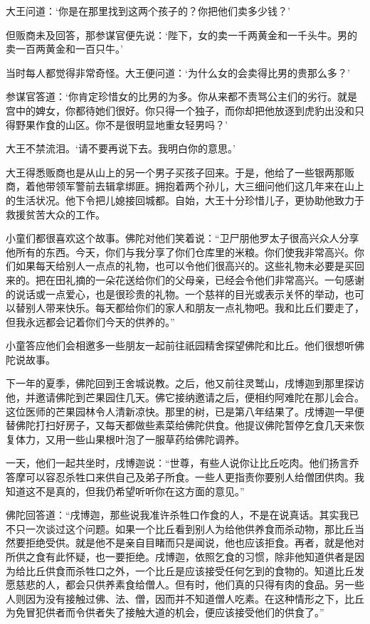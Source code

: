 \documentclass[12pt,twoside,openany]{book}
\begin{document}
大王问道：‘你是在那里找到这两个孩子的？你把他们卖多少钱？’

但贩商未及回答，那参谋官便先说：‘陛下，女的卖一千两黄金和一千头牛。男的卖一百两黄金和一百只牛。’

当时每人都觉得非常奇怪。大王便问道：‘为什么女的会卖得比男的贵那么多？’

参谋官答道：‘你肯定珍惜女的比男的为多。你从来都不责骂公主们的劣行。就是宫中的婢女，你都待她们很好。你只得一个独子，而你却把他放逐到虎豹出没和只得野果作食的山区。你不是很明显地重女轻男吗？’

大王不禁流泪。‘请不要再说下去。我明白你的意思。’

大王得悉贩商也是从山上的另一个男子买孩子回来。于是，他给了一些银两那贩商，着他带领军警前去辑拿绑匪。拥抱着两个孙儿，大三细问他们这几年来在山上的生活状况。他下令把儿媳接回城都。自始，大王十分珍惜儿子，更协助他致力于救援贫苦大众的工作。

小童们都很喜欢这个故事。佛陀对他们笑着说：“卫尸朋他罗太子很高兴众人分享他所有的东西。今天，你们与我分享了你们仓库里的米粮。你们使我非常高兴。你们如果每天给别人一点点的礼物，也可以令他们很高兴的。这些礼物未必要是买回来的。把在田礼摘的一朵花送给你们的父母亲，已经会令他们非常高兴。一句感谢的说话或一点爱心，也是很珍贵的礼物。一个慈祥的目光或表示关怀的举动，也可以替别人带来快乐。每天都给你们的家人和朋友一点礼物吧。我和比丘们要走了，但我永远都会记着你们今天的供养的。”

小童答应他们会相邀多一些朋友一起前往祇园精舍探望佛陀和比丘。他们很想听佛陀说故事。

下一年的夏季，佛陀回到王舍城说教。之后，他又前往灵鹫山，戌博迦到那里探访他，并邀请佛陀到芒果园住几天。佛它接纳邀请之后，便相约阿难陀在那儿会合。这位医师的芒果园林令人清新凉快。那里的树，已是第八年结果了。戌博迦一早便替佛陀打扫好房子，又每天都做些素菜给佛陀供食。他提议佛陀暂停乞食几天来恢复体力，又用一些山果根叶泡了一服草药给佛陀调养。

一天，他们一起共坐时，戌博迦说：“世尊，有些人说你让比丘吃肉。他们扬言乔答摩可以容忍杀牲口来供自己及弟子所食。一些人更指责你要别人给僧团供肉。我知道这不是真的，但我仍希望听听你在这方面的意见。”

佛陀回答道：“戌博迦，那些说我准许杀牲口作食的人，不是在说真话。其实我已不只一次谈过这个问题。如果一个比丘看到别人为给他供养食而杀动物，那比丘当然要拒绝受供。就是他不是亲自目睹而只是闻说，他也应该拒食。再者，就是他对所供之食有此怀疑，也一要拒绝。戌博迦，依照乞食的习惯，除非他知道供者是因为给比丘供食而杀牲口之外，一个比丘是应该接受任何乞到的食物的。知道比丘发愿慈悲的人，都会只供养素食给僧人。但有时，他们真的只得有肉的食品。另一些人则因为没有接触过佛、法、僧，因而并不知道僧人吃素。在这种情形之下，比丘为免冒犯供者而令供者失了接触大道的机会，便应该接受他们的供食了。”
\end{document}
